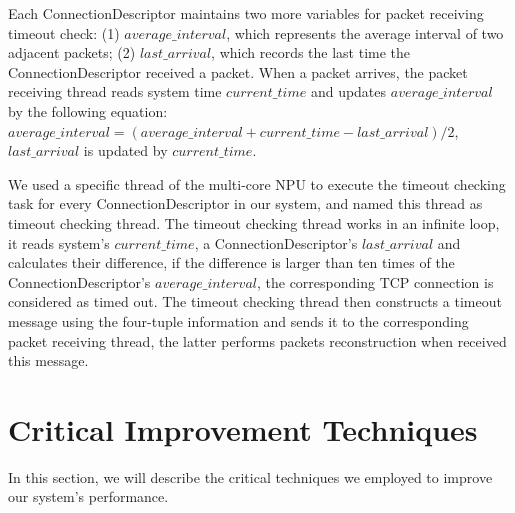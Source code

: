 \documentclass[conference]{IEEEtran}
\begin{document}
Each ConnectionDescriptor maintains two more variables for packet receiving timeout check: (1) $average\_interval$, which represents the average interval of two adjacent packets; (2) $last\_arrival$, which records the last time the ConnectionDescriptor received a packet. When a packet arrives, the packet receiving thread reads system time $current\_time$ and updates $average\_interval$ by the following equation: $average\_interval = (average\_interval + current\_time - last\_arrival) / 2$, $last\_arrival$ is updated by $current\_time$.

We used a specific thread of the multi-core NPU to execute the timeout checking task for every ConnectionDescriptor in our system, and named this thread as timeout checking thread. The timeout checking thread works in an infinite loop, it reads system's $current\_time$, a ConnectionDescriptor's $last\_arrival$ and calculates their difference, if the difference is larger than ten times of the ConnectionDescriptor's $average\_interval$, the corresponding TCP connection is considered as timed out. The timeout checking thread then constructs a timeout message using the four-tuple information and sends it to the corresponding packet receiving thread, the latter performs packets reconstruction when received this message.
\section{Critical Improvement Techniques}
In this section, we will describe the critical techniques we employed to improve our system's performance.
\end{document}
